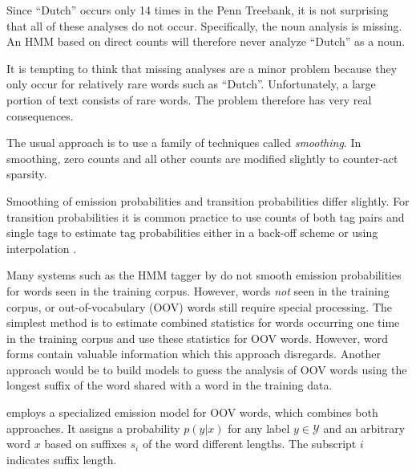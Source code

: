 Since ``Dutch'' occurs only 14 times in the Penn Treebank, it is not
surprising that all of these analyses do not occur. Specifically, the
noun analysis is missing. An HMM based on direct counts will therefore
never analyze ``Dutch'' as a noun.

It is tempting to think that missing analyses are a minor problem
because they only occur for relatively rare words such as
``Dutch''. Unfortunately, a large portion of text consists of rare
words. The problem therefore has very real consequences.

The usual approach is to use a family of techniques called {\it
  smoothing}. In smoothing, zero counts and all other counts are
modified slightly to counter-act sparsity.

Smoothing of emission probabilities and transition probabilities differ
slightly. For transition probabilities it is common practice to use
counts of both tag pairs and single tags to estimate tag probabilities
either in a back-off scheme or using interpolation
\citep{Brants2000}. %

Many systems such as the HMM tagger by \cite{Brants2000} do not smooth
emission probabilities for words seen in the training corpus. However,
words {\it not} seen in the training corpus, or out-of-vocabulary
(OOV) words still require special processing. The simplest method is
to estimate combined statistics for words occurring one time in the
training corpus and use these statistics for OOV words. However, word
forms contain valuable information which this approach
disregards. Another approach would be to build models to guess the
analysis of OOV words using the longest suffix of the word shared with
a word in the training data.

\cite{Brants2000} employs a specialized emission model for OOV words,
which combines both appro\-aches. It assigns a probability $p(y|x)$ for
any label $y \in \mathcal{Y}$ and an arbitrary word $x$ based on
suffixes $s_i$ of the word different lengths. The subscript $i$
indicates suffix length.

